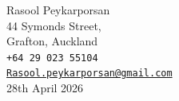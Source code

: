 \documentclass[letterpaper,11pt]{article}
\begin{document}

%
\vspace*{15pt}

Rasool Peykarporsan\\
44 Symonds Street, \\
Grafton, Auckland\\
\faPhone* \hspace{1pt} \texttt{+64 29 023 55104}\\
\faEnvelope \hspace{2pt} \href{mailto:Rasool.peykarporsan@gmail.com}{\texttt{Rasool.peykarporsan@gmail.com}}\\[20pt]

28th April 2026 \\[15pt]
\end{document}
